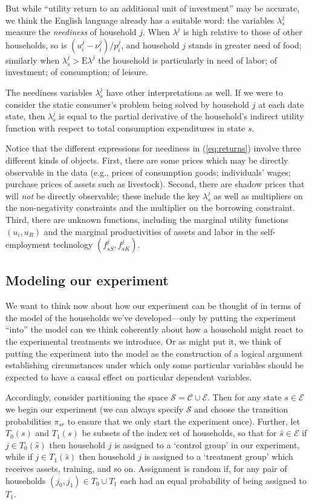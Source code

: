 \documentclass[11pt]{article}
\newcommand{\E}{\ensuremath{\mbox{E}}}
\newcommand{\Eq}[1]{(\ref{eq:#1})}
\begin{document}
But while ``utility return to an additional unit of investment'' may
be accurate, we think the English language already has a suitable
word: the variables $\lambda^j_s$ measure the \emph{neediness} of
household \(j\).  When $\lambda^j$ is high relative to those of other
households, so is $(u^j_i-\nu^j_i)/p^j_i$, and household \(j\) stands in greater
need of food; similarly when $\lambda^j_s>\E\lambda^j$ the household
is particularly in need of labor; of investment; of consumption; of
leisure. 

The neediness variables $\lambda^j_s$ have other interpretations as
well.  If we were to consider the static consumer's problem being
solved by household $j$ at each  date state, then $\lambda^j_s$ is
equal to the partial derivative of the household's indirect utility
function with respect to total consumption expenditures in state $s$.

Notice that the different expressions for neediness in \Eq{returns}
involve three different kinds of objects.  First, there are some
prices which may be directly observable in the data (e.g., prices of
consumption goods; individuals' wages; purchase prices of assets such
as livestock).  Second, there are shadow prices that will \emph{not}
be directly observable; these include the key $\lambda^j_s$ as well as
multipliers on the non-negativity constraints and the multiplier on
the borrowing constraint.  Third, there are unknown functions,
including the marginal utility functions $(u_i,u_R)$ and the marginal
productivities of assets and labor in the self-employment technology
$(f^j_{sS},f^j_{sK})$.

\subsection*{Modeling our experiment}
\label{sec-4-1}

We want to think now about how our experiment can be thought of in
terms of the model of the households we've developed---only by putting
the experiment ``into'' the model can we think coherently about how a
household might react to the experimental treatments we introduce.  Or
as \cite{Rubin74} might put it, we think of putting the experiment
into the model as the construction of a logical argument establishing
circumstances under which only some particular variables should be
expected to have a causal effect on particular dependent variables.

Accordingly, consider partitioning the space
$\mathcal{S}=\mathcal{C}\cup\mathcal{E}$.  Then for any state
$s\in\mathcal{E}$ we begin our experiment (we can always specify
\(\mathcal{S}\) and choose the transition probabilities $\pi_{sr}$ to
ensure that we only start the experiment once).  Further, let $T_0(s)$
and $T_1(s)$ be subsets of the index set of households, so that for
$\hat s\in\mathcal{E}$ if $j\in T_0(\hat s)$ then household \(j\) is
assigned to a `control group' in our experiment, while if $j\in
T_1(\hat s)$ then household \(j\) is assigned to a `treatment group'
which receives assets, training, and so on.  Assignment is random if,
for any pair of households $(j_0,j_1)\in T_0\cup T_1$ each had an
equal probability of being assigned to $T_1$.
\end{document}
